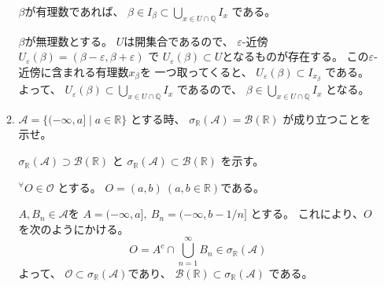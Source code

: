 \documentclass[12pt,b5paper]{ltjsarticle}
\begin{document}
\begin{enumerate}
\begin{enumerate}
            $\beta$が有理数であれば、
            $\beta\in I_{\beta} \subset \bigcup_{x\in U\cap \mathbb{Q}}I_{x}$
            である。

            $\beta$が無理数とする。
            $U$は開集合であるので、
            $\varepsilon$-近傍
            $U_{\varepsilon}(\beta)=(\beta-\varepsilon, \beta+\varepsilon)$
            で
            $U_{\varepsilon}(\beta) \subset U$となるものが存在する。
            この$\varepsilon$-近傍に含まれる有理数$x_{\beta}$を
            一つ取ってくると、
            $U_{\varepsilon}(\beta) \subset I_{x_{\beta}}$
            である。
            よって、
            $U_{\varepsilon}(\beta) \subset \bigcup_{x\in U\cap \mathbb{Q}}I_{x}$
            であるので、
            $\beta \in\bigcup_{x\in U\cap \mathbb{Q}}I_{x}$
            となる。
            


            \hrulefill
       \item
            $\mathcal{A}=\{ (-\infty,a] \mid a\in\mathbb{R} \}$
            とする時、
            $\sigma_{\mathbb{R}}(\mathcal{A}) = \mathcal{B}(\mathbb{R})$
            が成り立つことを示せ。

            \dotfill

            $\sigma_{\mathbb{R}}(\mathcal{A}) \supset \mathcal{B}(\mathbb{R})$
            と
            $\sigma_{\mathbb{R}}(\mathcal{A}) \subset \mathcal{B}(\mathbb{R})$
            を示す。


            ${}^{\forall}O\in\mathcal{O}$
            とする。
            $O=(a,b) \ (a,b\in\mathbb{R})$である。
            
            $A,B_{n}\in\mathcal{A}$を
            $A=(-\infty,a],\ B_{n}=(-\infty,b-1/n]$
            とする。
            これにより、$O$を次のようにかける。
            \begin{equation}
             O=A^{c} \cap \bigcup_{n=1}^{\infty}B_{n}
              \in\sigma_{\mathbb{R}}(\mathcal{A})
            \end{equation}
            よって、
            $\mathcal{O} \subset \sigma_{\mathbb{R}}(\mathcal{A})$であり、
            $\mathcal{B}(\mathbb{R}) \subset \sigma_{\mathbb{R}}(\mathcal{A})$
            である。



\end{enumerate}
\end{enumerate}
\end{document}
